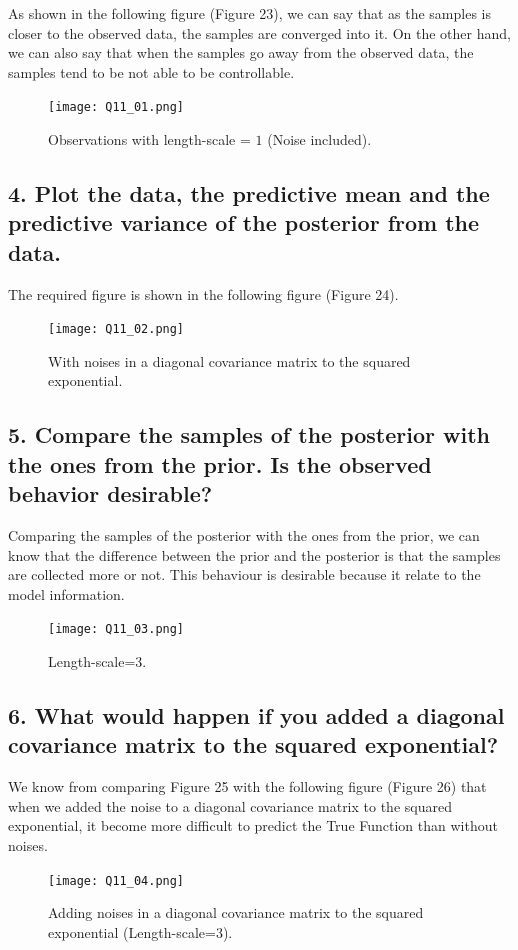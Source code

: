 \documentclass[12pt,letterpaper]{article}
\begin{document}
As shown in the following figure (Figure 23), we can say that
as the samples is closer to the observed data,
the samples are converged into it.
On the other hand, we can also say that
when the samples go away from the observed data,
the samples tend to be not able to be controllable.

\begin{figure}[htb]
\centering
\texttt{[image: Q11\_01.png]} 
\caption{Observations with length-scale = $1$ (Noise included).}
\end{figure}


\subsection*{4. Plot the data, the predictive mean and the predictive variance of the posterior from the data.}

The required figure is shown in the following figure (Figure 24).

\begin{figure}[htb]
\centering
\texttt{[image: Q11\_02.png]} 
\caption{With noises in a diagonal covariance matrix to the squared exponential.}
\end{figure}


\subsection*{5. Compare the samples of the posterior with the ones from the prior. Is the observed behavior desirable?}

Comparing the samples of the posterior with the ones from the prior,
we can know that
the difference between  the prior and the posterior is that 
the samples are collected more or not.
This behaviour is desirable because it relate to the model information.


\begin{figure}[htb]
\centering
\texttt{[image: Q11\_03.png]} 
\caption{Length-scale=3.}
\end{figure}



\subsection*{6. What would happen if you added a diagonal covariance matrix to the squared exponential?}

We know from comparing Figure 25 with the following figure (Figure 26) that
when we added the noise to a diagonal covariance matrix to the squared exponential,
it become more difficult to predict the True Function than without noises.


\begin{figure}[htb]
\centering
\texttt{[image: Q11\_04.png]} 
\caption{Adding noises in a diagonal covariance matrix to the squared exponential (Length-scale=3).}
\end{figure}
\end{document}
